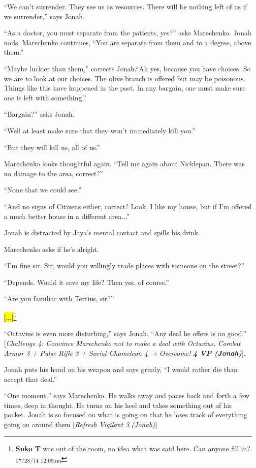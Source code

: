 ``We can't surrender.  They see us as resources.  There will be nothing left of us if we surrender,'' says Jonah.

``As a doctor, you must separate from the patients, yes?'' asks Marechenko.  Jonah nods.  Marechenko continues, ``You are separate from them and to a degree, above them.''

``Maybe luckier than them,'' corrects Jonah.``Ah yes, because you have choices.  So we are to look at our choices.  The olive branch is offered but may be poisonous.  Things like this have happened in the past.  In any bargain, one must make sure one is left with something.''

``Bargain?'' asks Jonah.

``Well at least make sure that they won't immediately kill you.''

``But they will kill us, all of us.''

Marechenko looks thoughtful again.  ``Tell me again about Nicklepan. There was no damage to the area, correct?''

``None that we could see.''

``And no signs of Citizens either, correct?   Look, I like my house, but if I'm offered a much better house in a different area...''

 Jonah is distracted by Jaya's mental contact and spills his drink.

Marechenko asks if he's alright.

``I'm fine sir.  Sir, would you willingly trade places with someone on the street?''

``Depends.  Would it save my life?  Then yes, of course.''

``Are you familiar with Tertius, sir?''

\hl{{[}...{]}}\footnote{\textbf{Suko T }was out of the room, no idea what was said here.  Can anyone fill in? \textsubscript{07/28/14 12:09am}}

``Octavius is even more disturbing,'' says Jonah.  ``Any deal he offers is no good.'' {[}\textit{Challenge 4: Convince Marechenko not to make a deal with Octavius.  Combat Armor 3 + Pulse Rifle 3 + Social Chameleon 4 → Overcome! }\textit{\textbf{4 VP (Jonah)}}{]}.  

Jonah puts his hand on his weapon and says grimly, ``I would rather die than accept that deal.''

``One moment,'' says Marechenko. He walks away and paces back and forth a few times, deep in thought.  He turns on his heel and takes something out of his pocket.  Jonah is so focused on what is going on that he loses track of everything going on around them {[}\textit{Refresh Vigilant 3 (Jonah)}{]}

